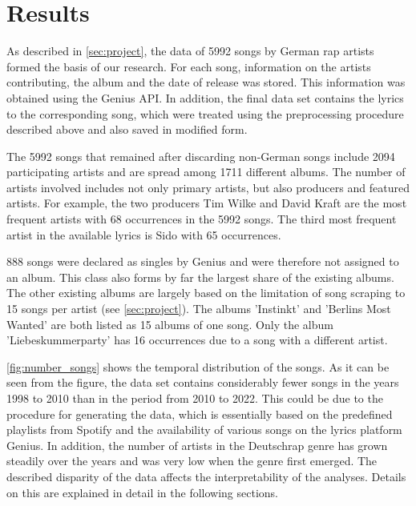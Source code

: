 \section{Results}\label{sec:results}

As described in \autoref{sec:project}, the data of 5992 songs by German rap artists formed the basis of our research. For each song, information on the artists contributing, the album and the date of release was stored. This information was obtained using the Genius API. In addition, the final data set contains the lyrics to the corresponding song, which were treated using the preprocessing procedure described above and also saved in modified form.

The 5992 songs that remained after discarding non-German songs include 2094 participating artists and are spread among 1711 different albums. The number of artists involved includes not only primary artists, but also producers and featured artists. For example, the two producers Tim Wilke and David Kraft are the most frequent artists with 68 occurrences in the 5992 songs. The third most frequent artist in the available lyrics is Sido with 65 occurrences.

888 songs were declared as singles by Genius and were therefore not assigned to an album. This class also forms by far the largest share of the existing albums. The other existing albums are largely based on the limitation of song scraping to 15 songs per artist (see \autoref{sec:project}). The albums 'Instinkt' and 'Berlins Most Wanted' are both listed as 15 albums of one song. Only the album 'Liebeskummerparty' has 16 occurrences due to a song with a different artist.

\autoref{fig:number_songs} shows the temporal distribution of the songs. As it can be seen from the figure, the data set contains considerably fewer songs in the years 1998 to 2010 than in the period from 2010 to 2022. This could be due to the procedure for generating the data, which is essentially based on the predefined playlists from Spotify and the availability of various songs on the lyrics platform Genius. In addition, the number of artists in the Deutschrap genre has grown steadily over the years and was very low when the genre first emerged. The described disparity of the data affects the interpretability of the analyses. Details on this are explained in detail in the following sections.

